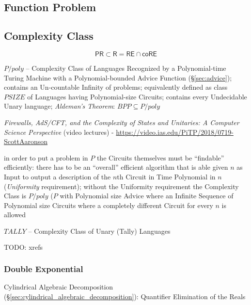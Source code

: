 \subsection{Function Problem}\label{sec:function_problem}

\subsection{Complexity Class}\label{sec:complexity_class}

\[
  \mathsf{PR} \subset \mathsf{R} = \mathsf{RE} \cap \mathsf{coRE}
\]

$P/poly$ -- Complexity Class of Languages Recognized by a Polynomial-time Turing
Machine with a Polynomial-bounded Advice Function (\S\ref{sec:advice}); contains
an Un-countable Infinity of problems; equivalently defined as class $PSIZE$ of
Languages having Polynomial-size Circuits; contains every Undecidable Unary
language; \emph{Aldeman's Theorem}: $BPP \subseteq P/poly$

\emph{Firewalls, AdS/CFT, and the Complexity of States and Unitaries: A Computer
  Science Perspective}
(video lectures)
-
\url{https://video.ias.edu/PiTP/2018/0719-ScottAaronson}

in order to put a problem in $P$ the Circuits themselves must be ``findable''
efficiently: there has to be an ``overall'' efficient algorithm that is able
given $n$ as Input to output a description of the $n$th Circuit in Time
Polynomial in $n$ (\emph{Uniformity} requirement); without the Uniformity
requirement the Complexity Class is $P/poly$ ($P$ with Polynomial size Advice
where an Infinite Sequence of Polynomial size Circuits where a completely
different Circuit for every $n$ is allowed

$TALLY$ -- Complexity Class of Unary (Tally) Languages

TODO: xrefs



\subsubsection{Double Exponential}\label{sec:double_exponential}

Cylindrical Algebraic Decomposition
(\S\ref{sec:cylindrical_algebraic_decomposition}): Quantifier Elimination of
the Reals



